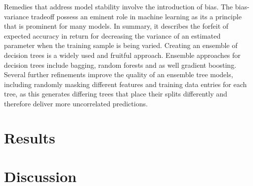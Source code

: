 \documentclass[a4paper, 11pt]{article}
\begin{document}
Remedies that address model stability involve the introduction of bias. The bias-variance tradeoff possess an eminent role in machine learning as its a principle that is prominent for many models. In summary, it describes the forfeit of expected accuracy in return for decreasing the variance of an estimated parameter when the training sample is being varied. Creating an ensemble of decision trees is a widely used and fruitful approach. Ensemble approaches for decision trees include bagging, random forests and as well gradient boosting. Several further refinements improve the quality of an ensemble tree models, including randomly masking different features and training data entries for each tree, as this generates differing trees that place their splits differently and therefore deliver more uncorrelated predictions.

\section{Results}

\section{Discussion}

\printbibliography
\end{document}
